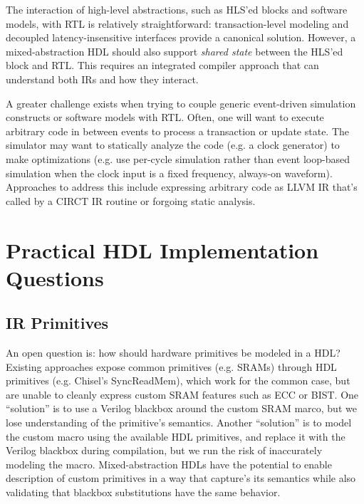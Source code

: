 \documentclass[sigplan,review,nonacm]{acmart}
\begin{document}
The interaction of high-level abstractions, such as HLS'ed blocks and software models, with RTL is relatively straightforward: transaction-level modeling and decoupled latency-insensitive interfaces provide a canonical solution\cite{umoc}.
However, a mixed-abstraction HDL should also support \textit{shared state} between the HLS'ed block and RTL.
This requires an integrated compiler approach that can understand both IRs and how they interact.

A greater challenge exists when trying to couple generic event-driven simulation constructs or software models with RTL.
Often, one will want to execute arbitrary code in between events to process a transaction or update state.
The simulator may want to statically analyze the code (e.g. a clock generator) to make optimizations (e.g. use per-cycle simulation rather than event loop-based simulation when the clock input is a fixed frequency, always-on waveform).
Approaches to address this include expressing arbitrary code as LLVM IR that's called by a CIRCT IR routine or forgoing static analysis.

\section{Practical HDL Implementation Questions}


\subsection{IR Primitives}


An open question is: how should hardware primitives be modeled in a HDL?
Existing approaches expose common primitives (e.g. SRAMs) through HDL primitives (e.g. Chisel's SyncReadMem), which work for the common case, but are unable to cleanly express custom SRAM features such as ECC or BIST.
One ``solution'' is to use a Verilog blackbox around the custom SRAM marco, but we lose understanding of the primitive's semantics.
Another ``solution'' is to model the custom macro using the available HDL primitives, and replace it with the Verilog blackbox during compilation, but we run the risk of inaccurately modeling the macro.
Mixed-abstraction HDLs have the potential to enable description of custom primitives in a way that capture's its semantics while also validating that blackbox substitutions have the same behavior.
\end{document}
